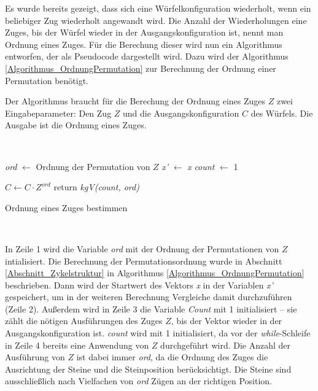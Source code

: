 \documentclass[12pt,a4paper, usenames, dvipsnames]{article}
\theoremstyle{mystyle}
\theoremstyle{definition}
\begin{document}
Es wurde bereits gezeigt, dass sich eine Würfelkonfiguration wiederholt, wenn ein beliebiger Zug wiederholt angewandt wird. Die Anzahl der Wiederholungen eine Zuges, bis der Würfel wieder in der Ausgangskonfiguration ist, nennt man Ordnung eines Zuges. Für die Berechung dieser wird nun ein Algorithmus entworfen, der als Pseudocode dargestellt wird. Dazu wird der Algorithmus \ref{Algorithmus_OrdnungPermutation} zur Berechnung der Ordnung einer Permutation benötigt.

Der Algorithmus braucht für die Berechung der Ordnung eines Zuges $Z$ zwei Eingabeparameter: Den Zug $Z$ und die Ausgangskonfiguration $C$ des Würfels. Die Ausgabe ist die Ordnung eines Zuges.


\begin{minipage}[H]{0.15\textwidth}
      $\ $
\end{minipage}
\begin{minipage}[H]{0.65\textwidth}
\begin{algorithm}[H]
\LinesNumbered
\DontPrintSemicolon
{}

 \textit{ord} $\leftarrow$ Ordnung der Permutation von $Z$\;
  \textit{x'} $\leftarrow$ \textit{x}\;
  \textit{count} $\leftarrow$ 1\;

  $C \leftarrow C \cdot  Z^\textit{ord}$ \; 
 return \textit{kgV(count, ord)} \;

\caption{Ordnung eines Zuges bestimmen} 
\label{Algorithmus_OrdnungZug}
\end{algorithm}
\end{minipage}
\begin{minipage}[H]{0.2\textwidth}
      $\ $
\end{minipage}

\vspace*{1em}

In Zeile 1 wird die Variable \textit{ord} mit der Ordnung der Permutationen von $Z$ intialisiert. Die Berechnung der Permutationsordnung wurde in Abschnitt \ref{Abschnitt_Zykelstruktur} in Algorithmus \ref{Algorithmus_OrdnungPermutation} beschrieben. Dann wird der Startwert des Vektors \textit{x} in der Variablen \textit{x'} gespeichert, um in der weiteren Berechnung Vergleiche damit durchzuführen (Zeile 2). Außerdem wird in Zeile 3 die Variable \textit{Count} mit 1 initialisiert -- sie zählt die nötigen Ausführungen des Zuges $Z$, bis der Vektor wieder in der Ausgangskonfiguration ist. \textit{count} wird mit 1 initialisiert, da vor der \textit{while}-Schleife in Zeile 4 bereits eine Anwendung von $Z$ durchgeführt wird. Die Anzahl der Ausführung von $Z$ ist dabei immer \textit{ord}, da die Ordnung des Zuges die Ausrichtung der Steine und die Steinposition berücksichtigt. Die Steine sind ausschließlich nach Vielfachen von \textit{ord} Zügen an der richtigen Position.
\end{document}
